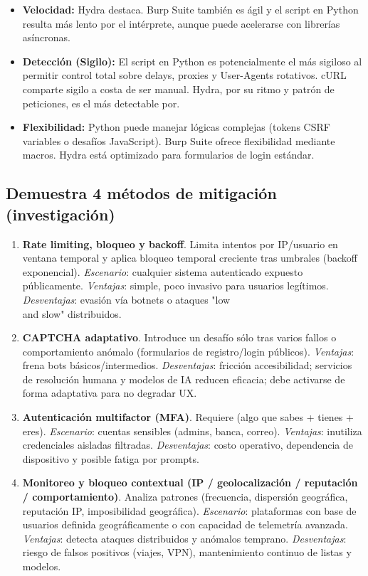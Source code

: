\documentclass[letterpaper,12pt]{article}
\let\origsubsection\subsection
\renewcommand{\subsection}{\FloatBarrier\origsubsection}
\begin{document}
\begin{itemize}
    \item \textbf{Velocidad:} Hydra destaca. Burp Suite también es ágil y el script en Python resulta más lento por el intérprete, aunque puede acelerarse con librerías asíncronas.
    \item \textbf{Detección (Sigilo):} El script en Python es potencialmente el más sigiloso al permitir control total sobre delays, proxies y User-Agents rotativos. cURL comparte sigilo a costa de ser manual. Hydra, por su ritmo y patrón de peticiones, es el más detectable por.
    \item \textbf{Flexibilidad:} Python puede manejar lógicas complejas (tokens CSRF variables o desafíos JavaScript). Burp Suite ofrece flexibilidad mediante macros. Hydra está optimizado para formularios de login estándar.
\end{itemize}

\newpage
\subsection{Demuestra 4 métodos de mitigación (investigación)}
\begin{enumerate}
  \item \textbf{Rate limiting, bloqueo y backoff}. Limita intentos por IP/usuario en ventana temporal y aplica bloqueo temporal creciente tras umbrales (backoff exponencial). \emph{Escenario}: cualquier sistema autenticado expuesto públicamente. \emph{Ventajas}: simple, poco invasivo para usuarios legítimos. \emph{Desventajas}: evasión vía botnets o ataques "low \\
  and slow" distribuidos.
  \item \textbf{CAPTCHA adaptativo}. Introduce un desafío sólo tras varios fallos o comportamiento anómalo (formularios de registro/login públicos). \emph{Ventajas}: frena bots básicos/intermedios. \emph{Desventajas}: fricción accesibilidad; servicios de resolución humana y modelos de IA reducen eficacia; debe activarse de forma adaptativa para no degradar UX.
  \item \textbf{Autenticación multifactor (MFA)}. Requiere (algo que sabes + tienes + eres). \emph{Escenario}: cuentas sensibles (admins, banca, correo). \emph{Ventajas}: inutiliza credenciales aisladas filtradas. \emph{Desventajas}: costo operativo, dependencia de dispositivo y posible fatiga por prompts.
  \item \textbf{Monitoreo y bloqueo contextual (IP / geolocalización / reputación / comportamiento)}. Analiza patrones (frecuencia, dispersión geográfica, reputación IP, imposibilidad geográfica). \emph{Escenario}: plataformas con base de usuarios definida geográficamente o con capacidad de telemetría avanzada. \emph{Ventajas}: detecta ataques distribuidos y anómalos temprano. \emph{Desventajas}: riesgo de falsos positivos (viajes, VPN), mantenimiento continuo de listas y modelos.
\end{enumerate}
\end{document}
